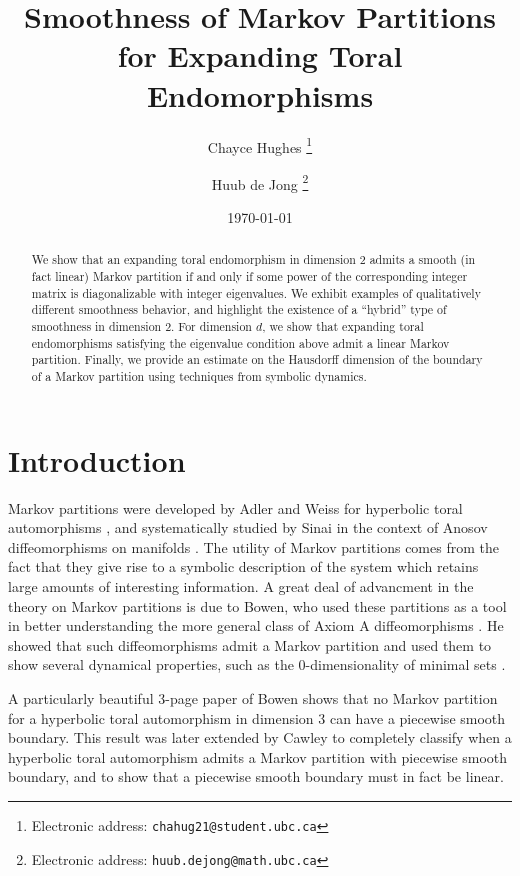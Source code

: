\documentclass{article}
\title{Smoothness of Markov Partitions for Expanding Toral Endomorphisms}
\author{Chayce Hughes%
  \thanks{Electronic address: \texttt{chahug21@student.ubc.ca}}\;}
\author{Huub de Jong%
  \thanks{Electronic address: \texttt{huub.dejong@math.ubc.ca}}}
\affil{The University of British Columbia, Vancouver}
\date{\today}
\begin{document}
\maketitle

\begin{abstract}
    We show that an expanding toral endomorphism in dimension 2 admits a smooth (in fact linear) Markov partition if and only if some power of the corresponding integer matrix is diagonalizable with integer eigenvalues. We exhibit examples of qualitatively different smoothness behavior, and highlight the existence of a ``hybrid'' type of smoothness in dimension 2. For dimension $d$, we show that expanding toral endomorphisms satisfying the eigenvalue condition above admit a linear Markov partition. Finally, we provide an estimate on the Hausdorff dimension of the boundary of a Markov partition using techniques from symbolic dynamics.
\end{abstract}

\section{Introduction} \label{Section:Intro}

Markov partitions were developed by Adler and Weiss for hyperbolic toral automorphisms \cite{AW}, and systematically studied by Sinai in the context of Anosov diffeomorphisms on manifolds \cite{Si}. The utility of Markov partitions comes from the fact that they give rise to a symbolic description of the system which retains large amounts of interesting information. A great deal of advancment in the theory on Markov partitions is due to Bowen, who used these partitions as a tool in better understanding the more general class of Axiom A diffeomorphisms \cite{Bo1}. He showed that such diffeomorphisms admit a Markov partition and used them to show several dynamical properties, such as the 0-dimensionality of minimal sets \cite{Bo3}. 

A particularly beautiful 3-page paper of Bowen \cite{Bo2} shows that no Markov partition for a hyperbolic toral automorphism in dimension 3 can have a piecewise smooth boundary. This result was later extended by Cawley \cite{C} to completely classify when a hyperbolic toral automorphism admits a Markov partition with piecewise smooth boundary, and to show that a piecewise smooth boundary must in fact be linear. 
\end{document}
